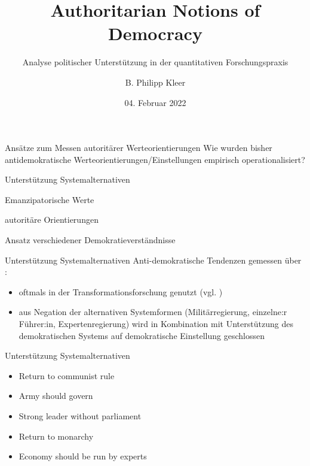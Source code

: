 \documentclass[11pt]{beamer}
\title{Authoritarian Notions of Democracy}
\subtitle{Analyse politischer Unterstützung in der quantitativen Forschungspraxis}
\date{04. Februar 2022}
\author{B. Philipp Kleer}
\institute{Institut für Politikwissenschaft | Justus-Liebig-Universität Gießen}
\begin{document}
\begin{frame}
	\maketitle
\end{frame}


\begin{frame}[t]{Ansätze zum Messen autoritärer Werteorientierungen}
 Wie wurden bisher antidemokratische Werteorientierungen/Einstellungen empirisch operationalisiert?
 
	\begin{abclist}
	 	\item Unterstützung Systemalternativen
	 	\item Emanzipatorische Werte
	 	\item autoritäre Orientierungen
	 	\item Ansatz verschiedener Demokratieverständnisse
	\end{abclist}
\end{frame}

\begin{frame}{Unterstützung Systemalternativen}
Anti-demokratische Tendenzen gemessen über :

	\begin{itemize}
		\item oftmals in der Transformationsforschung genutzt (vgl. \parencite{Linz1996, Rose1998})
		\item aus Negation der alternativen Systemformen (Militärregierung, einzelne:r Führer:in, Expertenregierung) wird in Kombination mit Unterstützung des demokratischen Systems auf demokratische Einstellung geschlossen
	\end{itemize}

\end{frame}

\begin{frame}{Unterstützung Systemalternativen}
	\begin{itemize}
		\item Return to communist rule
		\item Army should govern
		\item Strong leader without parliament
		\item Return to monarchy
		\item Economy should be run by experts \parencite[111]{Rose1998}
	\end{itemize}
\end{frame}
\end{document}
